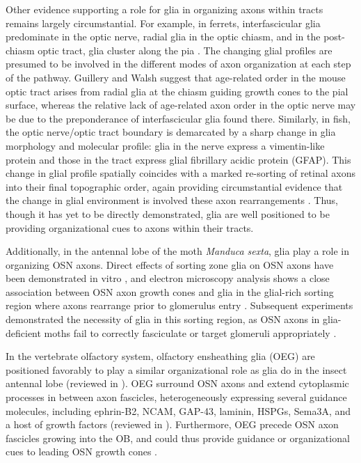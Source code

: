 Other evidence supporting a role for glia in organizing axons within tracts remains largely circumstantial. 
For example, in ferrets, interfascicular glia predominate in the optic nerve, radial glia in the optic chiasm, and in the post-chiasm optic tract, glia cluster along the pia \cite{guillery1987changing,colello1992observations}.
The changing glial profiles are presumed to be involved in the different modes of axon organization at each step of the pathway. 
Guillery and Walsh  suggest that age-related order in the mouse optic tract arises from radial glia at the chiasm guiding growth cones to the pial surface, whereas the relative lack of age-related axon order in the optic nerve may be due to the preponderance of interfascicular glia found there. 
Similarly, in fish, the optic nerve/optic tract boundary is demarcated by a sharp change in glia morphology and molecular profile: glia in the nerve express a vimentin-like protein and those in the tract express glial fibrillary acidic protein (GFAP).
This change in glial profile spatially coincides with a marked re-sorting of retinal axons into their final topographic order, again providing circumstantial evidence that the change in glial environment is involved these axon rearrangements \cite{maggs1986glial}.
Thus, though it has yet to be directly demonstrated, glia are well positioned to be providing organizational cues to axons within their tracts.

Additionally, in the antennal lobe of the moth \emph{Manduca sexta}, glia play a role in organizing OSN axons.
Direct effects of sorting zone glia on OSN axons have been demonstrated in vitro \cite{tucker2004vitro}, and electron microscopy analysis shows a close association between OSN axon growth cones and glia in the glial-rich sorting region where axons rearrange prior to glomerulus entry \cite{oland1998targeted}.
Subsequent experiments demonstrated the necessity of glia in this sorting region, as OSN axons in glia-deficient moths fail to correctly fasciculate or target glomeruli appropriately \cite{rossler1999development}. 

In the vertebrate olfactory system, olfactory ensheathing glia (OEG) are positioned favorably to play a similar organizational role as glia do in the insect antennal lobe (reviewed in ).
OEG surround OSN axons and extend cytoplasmic processes in between axon fascicles, heterogeneously expressing several guidance molecules, including ephrin-B2, NCAM, GAP-43, laminin, HSPGs, Sema3A, and a host of growth factors (reviewed in ).
Furthermore, OEG precede OSN axon fascicles growing into the OB, and could thus provide guidance or organizational cues to leading OSN growth cones \cite{chuah2002cellular,tolbert2004bidirectional}.

